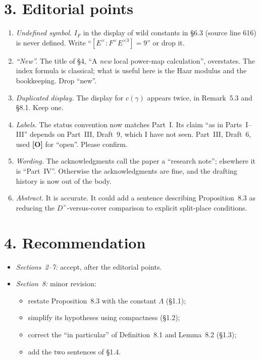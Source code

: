 \documentclass[11pt]{article}
\begin{document}
\section*{3. Editorial points}
\begin{enumerate}[label=(\arabic*)]
\item \emph{Undefined symbol.} $I_F$ in the display of wild constants in \S6.3 (source line 616)
is never defined. Write
``$[E^\times:F^\times E^{\times3}]=9$'' or drop it.
\item \emph{``New''.} The title of \S4, ``A \emph{new} local power-map
calculation'', overstates. The index formula is classical; what is
useful here is the Haar modulus and the bookkeeping. Drop ``new''.
\item \emph{Duplicated display.} The display for $c(\gamma)$ appears
twice, in Remark~5.3 and \S8.1. Keep one.
\item \emph{Labels.} The status convention now matches Part~I. Its claim
``as in Parts~I--III'' depends on Part~III, Draft~9, which I have not
seen. Part~III, Draft~6, used \textbf{[O]} for ``open''. Please
confirm.
\item \emph{Wording.} The acknowledgments call the paper a ``research
note''; elsewhere it is ``Part~IV''. Otherwise the acknowledgments are
fine, and the drafting history is now out of the body.
\item \emph{Abstract.} It is accurate. It could add a sentence describing
Proposition~8.3 as reducing the $D^\times$-versus-cover comparison to
explicit split-place conditions.
\end{enumerate}

\section*{4. Recommendation}
\begin{itemize}
\item \emph{Sections~2--7:} accept, after the editorial points.
\item \emph{Section~8:} minor revision:
\begin{itemize}
\item restate Proposition~8.3 with the constant $\Lambda$ (\S1.1);
\item simplify its hypotheses using compactness (\S1.2);
\item correct the ``in particular'' of Definition~8.1 and Lemma~8.2
(\S1.3);
\item add the two sentences of \S1.4.
\end{itemize}
\end{itemize}
\end{document}
